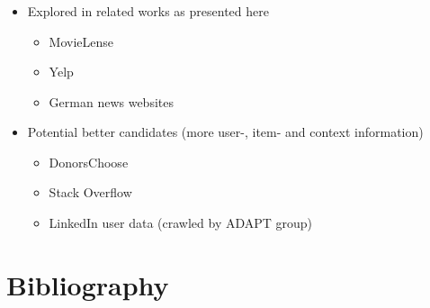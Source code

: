 \documentclass[aspectratio=169]{beamer}
\begin{document}
\begin{frame}
	\frametitle{\insertsection}

	\begin{itemize}
		\item Explored in related works as presented here
		\begin{itemize}
			\item MovieLense
			\item Yelp
			\item German news websites
		\end{itemize}
		\item Potential better candidates (more user-, item- and context information)
		\begin{itemize}
			\item DonorsChoose
			\item Stack Overflow
			\item LinkedIn user data (crawled by ADAPT group)
		\end{itemize}
	\end{itemize}
\end{frame}

\section*{Bibliography}
\begin{frame}
	\frametitle{\insertsection}

	\printbibliography
\end{frame}
\end{document}
